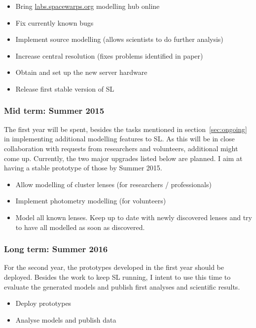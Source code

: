 \documentclass[11pt]{article}
\begin{document}
\begin{itemize}
  \item Bring \url{labs.spacewarps.org} modelling hub online
  \item Fix currently known bugs
  \item Implement source modelling (allows scientists to do further analysis)
  \item Increase central resolution (fixes problems identified in paper)
  \item Obtain and set up the new server hardware
  \item Release first stable version of SL
\end{itemize}


\subsubsection{Mid term: Summer 2015}

The first year will be spent, besides the tasks mentioned in section~\ref{sec:ongoing} in implementing additional modelling features to SL.
As this will be in close collaboration with requests from researchers and volunteers, additional might come up.
Currently, the two major upgrades listed below are planned. I aim at having a stable prototype of those by Summer 2015.

\begin{itemize}
  \item Allow modelling of cluster lenses (for researchers / professionals)
  \item Implement photometry modelling (for volunteers)
  \item Model all known lenses. Keep up to date with newly discovered lenses and try to have all modelled as soon as discovered.
\end{itemize}


\subsubsection{Long term: Summer 2016}

For the second year, the prototypes developed in the first year should be deployed.
Besides the work to keep SL running, I intent to use this time to evaluate the generated models and publish first analyses and scientific results.

\begin{itemize}
  \item Deploy prototypes
  \item Analyse models and publish data
\end{itemize}
\end{document}
